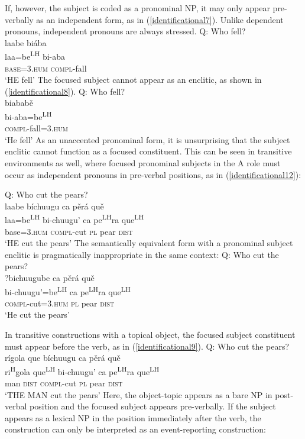 If, however, the subject is coded as a pronominal NP, it may only appear pre-verbally as an independent form, as in (\ref{identificational7}). Unlike dependent pronouns, independent pronouns are always stressed.
\ea\label{identificational7}  
{Q: Who fell?} \\
\glll laabe bi\'{a}ba   \\
laa=be\textsuperscript{LH} bi-aba  \\
\textsc{base}=\textsc{3.hum} \textsc{compl}-fall  \\
\glt `HE fell'
\z
The focused subject cannot appear as an enclitic, as shown in (\ref{identificational8}). 
\ea\label{identificational8}  
{Q: Who fell?} \\
\glll {\#}biabab\v{e}  \\
bi-aba=be\textsuperscript{LH}\\
\textsc{compl}-fall=\textsc{3.hum}  \\
\glt `He fell'  
\z
As an unaccented pronominal form, it is unsurprising that the subject enclitic cannot function as a focused constituent. This can be seen in transitive environments as well, where focused pronominal subjects in the A role must occur as independent pronouns in pre-verbal positions, as in (\ref{identificational12}):

\ea\label{identificational12} 
{Q: Who cut the pears?} \\
\glll laabe b\'{i}chuugu ca p\v{e}r\'{a} qu\v{e}  \\
laa=be\textsuperscript{LH} bi-chuugu' ca pe\textsuperscript{LH}ra que\textsuperscript{LH}  \\
base=\textsc{3.hum} \textsc{compl}-cut \textsc{pl} pear \textsc{dist}  \\
\glt `HE cut the pears'
\z
The semantically equivalent form with a pronominal subject enclitic is pragmatically inappropriate in the same context: 
\ea\label{identificational13}  
{Q: Who cut the pears?} \\
\glll ?bichuugube ca p\v{e}r\'{a} qu\v{e}  \\
bi-chuugu'=be\textsuperscript{LH} ca pe\textsuperscript{LH}ra que\textsuperscript{LH}  \\
\textsc{compl}-cut=\textsc{3.hum} \textsc{pl} pear \textsc{dist}  \\
\glt `He cut the pears'
\z

In transitive constructions with a topical object, the focused subject constituent must appear before the verb, as in (\ref{identificational9}). 
\ea\label{identificational9}  
{Q: Who cut the pears?} \\
\glll r\'{i}gola que b\'{i}chuugu ca p\v{e}r\'{a} qu\v{e}  \\
ri\textsuperscript{H}gola que\textsuperscript{LH} bi-chuugu' ca pe\textsuperscript{LH}ra que\textsuperscript{LH}  \\
man \textsc{dist} \textsc{compl}-cut \textsc{pl} pear \textsc{dist}  \\
\glt `THE MAN cut the pears'
\z
Here, the object-topic appears as a bare NP in post-verbal position and the focused subject appears pre-verbally. If the subject appears as a lexical NP in the position immediately after the verb, the construction can only be interpreted as an event-reporting construction:

